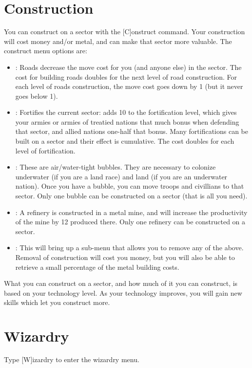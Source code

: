 \section{Construction}
You can construct on a sector with the [C]onstruct command.  Your
construction will cost money and/or metal, and can make that sector
more valuable.  The construct menu options are:
\begin{itemize}
\item
{}: Roads decrease the move cost for you (and anyone else)
in the sector.  The cost for building roads doubles for the next
level of road construction.  For each level of roads construction, the
move cost goes down by 1 (but it never goes below 1).
\item
{}: Fortifies the current sector: adds 10 to the
fortification level, which gives your armies or armies of treatied
nations that much bonus when defending that sector, and allied nations
one-half that bonus.  Many fortifications can be built on a sector
and their effect is cumulative.  The cost doubles for each level of
fortification.
\item
{}: These are air/water-tight bubbles.  They are necessary
to colonize underwater (if you are a land race) and land (if you
are an underwater nation).  Once you have a bubble, you can move
troops and civillians to that sector.  Only one bubble can be constructed
on a sector (that is all you need).
\item
{}: A refinery is constructed in a metal mine, and
will increase the productivity of the mine by 12%
produced there.  Only one refinery can be constructed on a sector.
\item
{}: This will bring up a sub-menu that allows you to
remove any of the above.  Removal of construction will cost you 
money, but you will also be able to retrieve a small percentage of
the metal building costs.
\end{itemize}

What you can construct on a sector, and how much of it you can
construct, is based on your technology level.  As your technology
improves, you will gain new skills which let you construct more.

\section{Wizardry}
\label{sec-wizardry}
Type [W]izardry to enter the wizardry menu.

